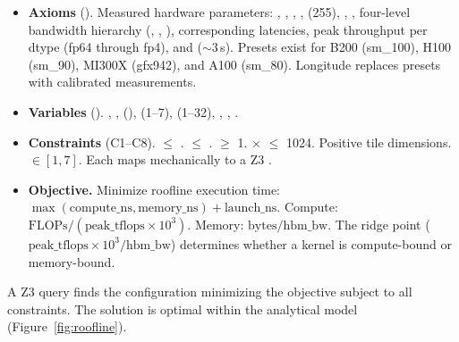 \begin{itemize}
  \item \textbf{Axioms} ().
    Measured hardware parameters: , , , ,  (255), , , four-level bandwidth hierarchy (, , ), corresponding latencies, peak throughput per dtype (fp64 through fp4), and  (${\sim}3$\,\textmu{}s).
    Presets exist for B200 (sm\_100), H100 (sm\_90), MI300X (gfx942), and A100 (sm\_80).
    Longitude replaces presets with calibrated measurements.
  \item \textbf{Variables} ().
    , ,  (),  (1--7),  (1--32), , , .
  \item \textbf{Constraints} (C1--C8).
     $\leq$ .
     $\leq$ .
     $\geq$ 1.
     $\times$  $\leq$ 1024.
    Positive tile dimensions.
     $\in [1,7]$.
    Each maps mechanically to a Z3 .
  \item \textbf{Objective.}
    Minimize roofline execution time: $\max(\text{compute\_ns}, \text{memory\_ns}) + \text{launch\_ns}$.
    Compute: $\text{FLOPs} / (\text{peak\_tflops} \times 10^3)$.
    Memory: $\text{bytes} / \text{hbm\_bw}$.
    The ridge point ($\text{peak\_tflops} \times 10^3 / \text{hbm\_bw}$) determines whether a kernel is compute-bound or memory-bound.
\end{itemize}

A Z3  query finds the configuration minimizing the objective subject to all constraints.
The solution is optimal within the analytical model (Figure~\ref{fig:roofline}).

